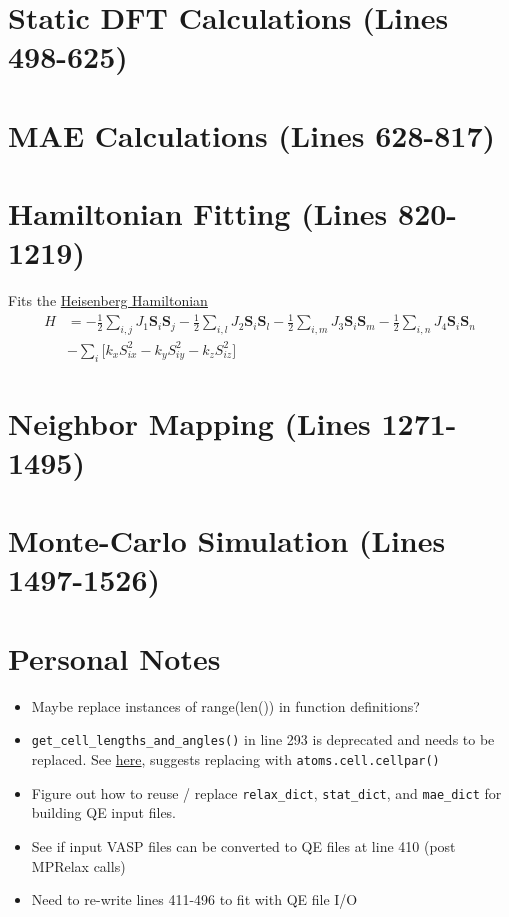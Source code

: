 \documentclass[12pt]{article}
\newcommand{\pmint}[1]{\texttt{#1}}
\begin{document}

\section*{Static DFT Calculations (Lines 498-625)} %

\section*{MAE Calculations (Lines 628-817) } %

\section*{Hamiltonian Fitting (Lines 820-1219)} %

Fits the \href{https://en.wikipedia.org/wiki/Quantum_Heisenberg_model}{Heisenberg Hamiltonian} 
\begin{align*}
    H &= -\frac{1}{2}\sum_{i,j} J_1\textbf{S}_i\textbf{S}_j-\frac{1}{2}\sum_{i,l} J_2\textbf{S}_i\textbf{S}_l-\frac{1}{2}\sum_{i,m} J_3\textbf{S}_i\textbf{S}_m-\frac{1}{2}\sum_{i,n} J_4\textbf{S}_i\textbf{S}_n \\
    &- \sum_i\Big[ k_xS_{ix}^2 - k_y S_{iy}^2- k_z S_{iz}^2\Big]
\end{align*}
 
\section*{Neighbor Mapping (Lines 1271-1495)} %

\section*{Monte-Carlo Simulation (Lines 1497-1526)} %

\section*{Personal Notes}
\begin{itemize}
    \item Maybe replace instances of range(len()) in function definitions?
    \item \texttt{get_cell_lengths_and_angles()} in line 293 is deprecated and needs to be replaced. See \href{https://wiki.fysik.dtu.dk/ase/releasenotes.html}{here}, suggests replacing with \texttt{atoms.cell.cellpar()}
    \item Figure out how to reuse / replace \pmint{relax_dict}, \pmint{stat_dict}, and \pmint{mae_dict} for building QE input files. 
    \item See if input VASP files can be converted to QE files at line 410 (post MPRelax calls)
    \item Need to re-write lines 411-496 to fit with QE file I/O
\end{itemize}
\end{document}
